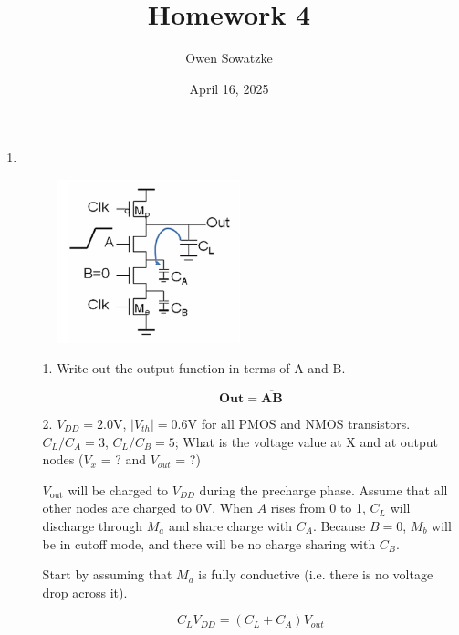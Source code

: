 \documentclass[fleqn]{article}
\title{Homework 4}
\author{Owen Sowatzke}
\date{April 16, 2025}
\newcommand{\zerodisplayskip}{
	\setlength{\abovedisplayskip}{0pt}%
	\setlength{\belowdisplayskip}{0pt}%
	\setlength{\abovedisplayshortskip}{0pt}%
	\setlength{\belowdisplayshortskip}{0pt}%
	\setlength{\mathindent}{0pt}}
\begin{document}
	\offinterlineskip
	\setlength{\lineskip}{12pt}
	\zerodisplayskip
	\maketitle
	
	\begin{enumerate}
		\item ~
		
			\begin{figure}[H]
				\centerline{\includegraphics[width=0.5\textwidth]{circuit_question1.png}}
				\label{fig::circuit_question1}
			\end{figure}

			\begin{enumerate}
			\item[1.] Write out the output function in terms of A and B.			
			
			\begin{equation*}
				\mathbf{Out = \overline{AB}}
			\end{equation*}
			
			\item[2.] $V_{DD}=2.0\text{V}$, $|V_{th}|=0.6\text{V}$ for all PMOS and NMOS transistors. $C_L/C_A=3$, $C_L/C_B=5$; What is the voltage value at X and at output nodes ($V_x$ = ? and $V_{out}$ = ?)
			
			$V_{\text{out}}$ will be charged to $V_{DD}$ during the precharge phase. Assume that all other nodes are charged to $0\text{V}$. When $A$ rises from 0 to 1, $C_L$ will discharge through $M_a$ and share charge with $C_A$. Because $B=0$, $M_b$ will be in cutoff mode, and there will be no charge sharing with $C_B$.
			
			Start by assuming that $M_a$ is fully conductive (i.e. there is no voltage drop across it).
			
			\begin{equation*}
				C_LV_{DD} = (C_L + C_A)V_{out} 
			\end{equation*}			
			

\end{enumerate}
\end{enumerate}
\end{document}
